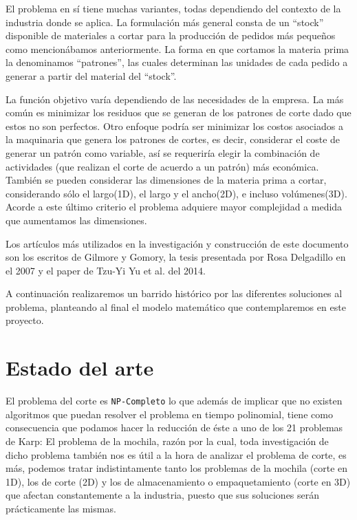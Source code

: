 \documentclass[journal, 10pt]{IEEEtran}
\begin{document}
	El problema en sí tiene muchas variantes, todas dependiendo del contexto
	de la industria donde se aplica. La formulación más general consta de
	un ``stock'' disponible de materiales a cortar para la producción de 
	pedidos más pequeños como mencionábamos anteriormente. La forma
	en que cortamos la materia prima la denominamos ``patrones'', las
	cuales determinan las unidades de cada pedido a generar a partir del
	material del ``stock''.
	
	La función objetivo varía dependiendo de las necesidades de la
	empresa. La más común es minimizar los residuos que se generan de
	los patrones de corte dado que estos no son perfectos.
	Otro enfoque podría ser minimizar los costos asociados a la maquinaria
	que genera los patrones de cortes, es decir, considerar el coste de
	generar un patrón como variable, así se requeriría elegir la combinación
	de actividades (que realizan el corte de acuerdo a un patrón) más 
	económica. También se pueden considerar las dimensiones de la materia
	prima a cortar, considerando sólo el largo(1D), el largo y el ancho(2D), 
	e incluso volúmenes(3D). Acorde a este último criterio el problema
	adquiere mayor complejidad a medida que aumentamos las dimensiones.
	
	Los artículos más utilizados en la investigación y construcción de este 
	documento son los escritos de Gilmore y 
	Gomory\cite{Gilmore:1961}\cite{Gilmore:1965}, la tesis presentada por 
	Rosa Delgadillo en el 2007\cite{Delgadillo:2007} y el paper de Tzu-Yi 
	Yu et al. del 2014\cite{Tzu-Yi Yu:2014}.
	
	A continuación realizaremos un barrido histórico por las diferentes
	soluciones al problema, planteando al final el modelo matemático
	que contemplaremos en este proyecto.

\section{Estado del arte} \label{sec:arte}
	El problema del corte es \texttt{NP-Completo} lo que además de implicar que
	no existen algoritmos que puedan resolver el problema en tiempo polinomial,
	tiene como consecuencia que podamos hacer la reducción de éste a uno de los
	21 problemas de Karp\cite{Karp:1972}: El problema de la mochila, razón por
	la cual, toda investigación de dicho problema también nos es útil a la hora
	de analizar el problema de corte, es más, podemos tratar indistintamente
	tanto los problemas de la mochila (corte en 1D), los de corte (2D) y los de
	almacenamiento o empaquetamiento (corte en 3D) que afectan constantemente a
	la industria, puesto que sus soluciones serán prácticamente las mismas.
	
\end{document}
